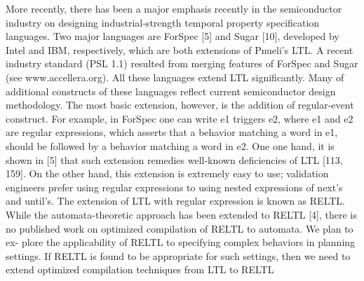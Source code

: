 More recently, there has been a major emphasis recently in the semiconductor industry on designing industrial-strength temporal property specification languages. Two major languages are ForSpec [5] and Sugar [10], developed by Intel and IBM, respectively, which are both extensions of Pnueli’s LTL. A recent industry standard (PSL 1.1) resulted from merging features of ForSpec and Sugar (see www.accellera.org). All these languages extend LTL significantly. Many of additional constructs of these languages reflect current semiconductor design methodology. The most basic extension, however, is the addition of regular-event construct. For example, in ForSpec one can write e1 triggers e2, where e1 and e2 are regular expressions, which asserts that a behavior matching a word in e1, should be followed by a behavior matching a word in e2. One one hand, it is shown in [5] that such extension remedies well-known deficiencies of LTL [113, 159]. On the other hand, this extension is extremely easy to use; validation engineers prefer using regular expressions to using nested expressions of next’s and until’s. The extension of LTL with regular expression is known as RELTL. While the automata-theoretic approach has been extended to RELTL [4], there is no published work on optimized compilation of RELTL to automata. We plan to ex- plore the applicability of RELTL to specifying complex behaviors in planning settings. If RELTL is found to be appropriate for such settings, then we need to extend optimized compilation techniques from LTL to RELTL








